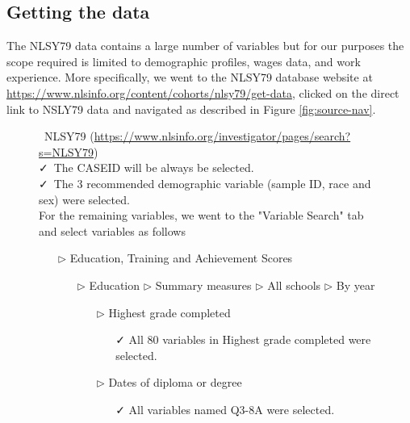 \documentclass{article}
\begin{document}
\hypertarget{getdata}{%
\subsection{Getting the data}\label{getdata}}

The NLSY79 data contains a large number of variables but for our purposes the scope required is limited to demographic profiles, wages data, and work experience. More specifically, we went to the NLSY79 database website at \url{https://www.nlsinfo.org/content/cohorts/nlsy79/get-data}, clicked on the direct link to NSLY79 data and navigated as described in Figure \ref{fig:source-nav}.

\begin{figure}[t]

\begin{tcolorbox}[title = Navigating the data source]
\faDatabase\ NLSY79 (\url{https://www.nlsinfo.org/investigator/pages/search?s=NLSY79})\\
\vspace{1mm}
\faCheck\ The CASEID will be always be selected.  \\
\vspace{1mm}
\faCheck\ The 3 recommended demographic variable (sample ID, race and sex) were selected.  \\
\vspace{1mm}
For the remaining variables, we went to the "Variable Search" tab and select variables as follows
\begin{itemize}
\item[$\triangleright$] Education, Training and Achievement Scores
\begin{itemize}
\item[$\triangleright$] Education $\triangleright$ Summary measures $\triangleright$ All schools $\triangleright$ By year
\begin{itemize}
\item[$\triangleright$] Highest grade completed
\begin{itemize}
\item[\faCheck] All 80 variables in Highest grade completed were selected.
\end{itemize}
\end{itemize}
\begin{itemize}
\item[$\triangleright$] Dates of diploma or degree
\begin{itemize}
\item[\faCheck] All variables named Q3-8A were selected.

\end{itemize}
\end{itemize}
\end{itemize}
\end{itemize}
\end{tcolorbox}
\end{figure}
\end{document}
